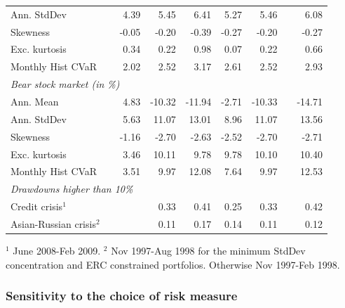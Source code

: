 \documentclass[12pt,a4paper]{article}
\begin{document}
\begin{table}[t]
\begin{center}
{\begin{tabular}{|lc rrrrrrrr| }
 \multicolumn{2}{|l}{Ann. StdDev }       &    &  4.39 & 5.45& 6.41 & 5.27 & 5.46 & & 6.08 \\
  \multicolumn{2}{|l}{Skewness }       &      &  -0.05 & -0.20 & -0.39 & -0.27 & -0.20 && -0.27   \\
    \multicolumn{2}{|l}{Exc. kurtosis }   &     & 0.34 &0.22 & 0.98 & 0.07 & 0.22 & & 0.66 \\
 \multicolumn{2}{|l}{Monthly Hist  CVaR}   &    &  2.02 & 2.52 & 3.17 & 2.61 & 2.52 & & 2.93 \\ \hline
 \multicolumn{10}{|l|}{\emph{Bear stock market (in \%)}} \\
 \multicolumn{2}{|l}{Ann. Mean  }    &       & 4.83  & -10.32 & -11.94 & -2.71 & -10.33 && -14.71 \\
 \multicolumn{2}{|l}{Ann. StdDev}     &       & 5.63 & 11.07 & 13.01 & 8.96 & 11.07 & & 13.56       \\
  \multicolumn{2}{|l}{Skewness}     &         & -1.16  & -2.70 & -2.63 & -2.52 & -2.70 && -2.71 \\
    \multicolumn{2}{|l}{Exc. kurtosis}   &     &3.46 & 10.11& 9.78 & 9.78 & 10.10 &  & 10.40     \\
 \multicolumn{2}{|l}{Monthly Hist  CVaR}   &	 & 3.51 & 9.97& 12.08 & 7.64 & 9.97 &  & 12.53 \\ \hline
\multicolumn{10}{|l|}{ \emph{Drawdowns higher than 10\%}  }  \\
 \multicolumn{2}{|l}{Credit crisis$^{1}$}       &   &  &  0.33 & 0.41 & 0.25 & 0.33 &  & 0.42  \\
 \multicolumn{2}{|l}{Asian-Russian crisis$^{2}$}&  & &  0.11   & 0.17 & 0.14 &0.11 & & 0.12 \\  \hline
\end{tabular}
}
\end{center}

{\scriptsize $^{1}$  June 2008-Feb 2009.  $^{2}$  Nov 1997-Aug 1998 for the minimum StdDev concentration and ERC constrained portfolios. Otherwise Nov 1997-Feb 1998.  }
\end{table}

\subsubsection{Sensitivity to the choice of risk measure}
\end{document}
